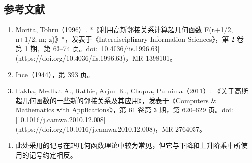 \subsection{参考文献}
\begin{enumerate}
\item Morita, Tohru（1996）. *《利用高斯邻接关系计算超几何函数 F(n+1/2, n+1/2; m; z)》*，发表于《Interdisciplinary Information Sciences》，第 2 卷第 1 期，第 63–74 页。doi: [10.4036/iis.1996.63](https://doi.org/10.4036/iis.1996.63)，MR 1398101。
\item Ince（1944），第 393 页。
\item Rakha, Medhat A.; Rathie, Arjun K.; Chopra, Purnima（2011）. 《关于高斯超几何函数的一些新的邻接关系及其应用》，发表于《Computers & Mathematics with Applications》，第 61 卷第 3 期，第 620–629 页。doi: [10.1016/j.camwa.2010.12.008](https://doi.org/10.1016/j.camwa.2010.12.008)，MR 2764057。
\end{enumerate}
\begin{enumerate}
\item 此处采用的记号在超几何函数理论中较为常见，但它与下降和上升阶乘中所使用的记号约定相反。
\end{enumerate}

